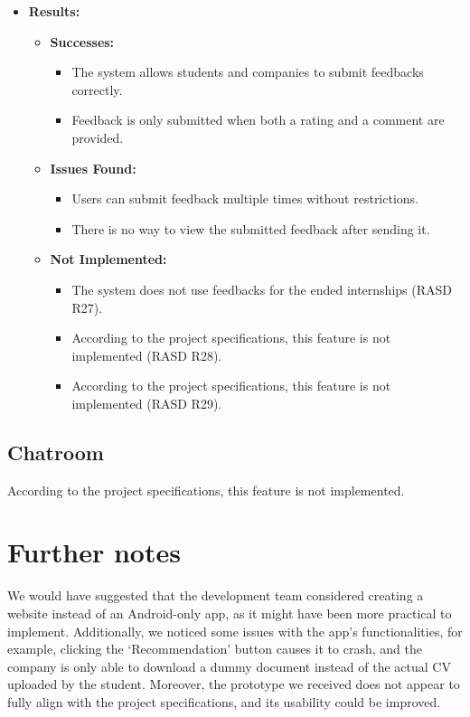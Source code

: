\begin{itemize}
    \item \textbf{Results:}
    \begin{itemize}
        \item \textbf{Successes:}
        \begin{itemize}
            \item The system allows students and companies to submit feedbacks correctly.
            \item Feedback is only submitted when both a rating and a comment are provided.
        \end{itemize}
        \item \textbf{Issues Found:}
        \begin{itemize}
            \item Users can submit feedback multiple times without restrictions.
            \item There is no way to view the submitted feedback after sending it.
        \end{itemize}
        \item \textbf{Not Implemented:}
        \begin{itemize}
            \item The system does not use feedbacks for the ended internships (RASD R27).
            \item According to the project specifications, this feature is not implemented (RASD R28).
            \item According to the project specifications, this feature is not implemented (RASD R29).
        \end{itemize}
    \end{itemize}
\end{itemize}

\subsection{Chatroom}
According to the project specifications, this feature is not implemented.

\section{Further notes}
We would have suggested that the development team considered creating a website instead of an Android-only app, as it might
have been more practical to implement.
Additionally, we noticed some issues with the app’s functionalities, for example, clicking the ‘Recommendation’ button causes
it to crash, and the company is only able to download a dummy document instead of the actual CV uploaded by the student.
Moreover, the prototype we received does not appear to fully align with the project specifications, and its usability could be improved.

